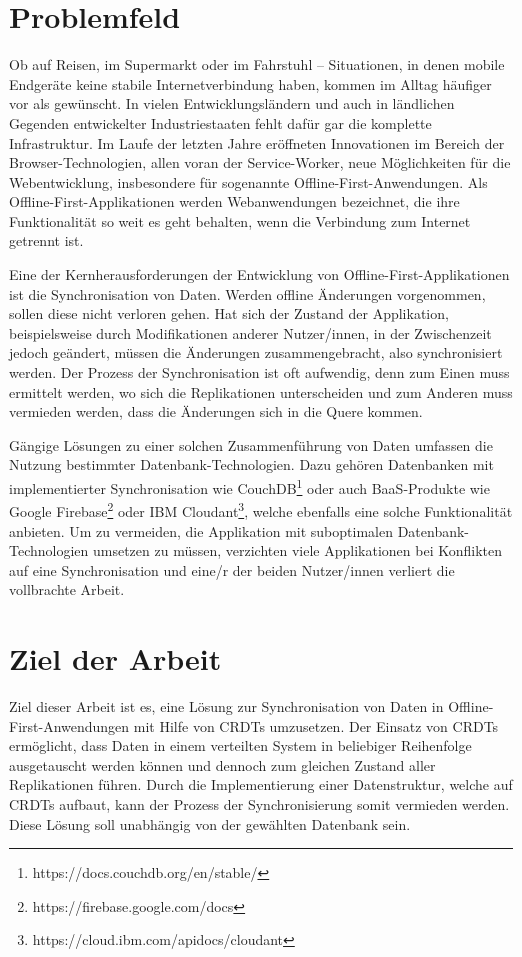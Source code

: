 \documentclass[a4paper, 12pt]{scrreprt}
\begin{document}
\section{Problemfeld}\label{sec:Problemfeld}

Ob auf Reisen, im Supermarkt oder im Fahrstuhl -- Situationen, in denen mobile Endgeräte keine stabile Internetverbindung haben, kommen im Alltag häufiger vor als gewünscht. In vielen Entwicklungsländern und auch in ländlichen Gegenden entwickelter Industriestaaten fehlt dafür gar die komplette Infrastruktur. Im Laufe der letzten Jahre eröffneten Innovationen im Bereich der Browser-Technologien, allen voran der Service-Worker, neue Möglichkeiten für die Webentwicklung, insbesondere für sogenannte Offline-First-Anwendungen. Als Offline-First-Applikationen werden Webanwendungen bezeichnet, die ihre Funktionalität so weit es geht behalten, wenn die Verbindung zum Internet getrennt ist.

Eine der Kernherausforderungen der Entwicklung von Offline-First-Applikationen ist die Synchronisation von Daten. Werden offline Änderungen vorgenommen, sollen diese nicht verloren gehen. Hat sich der Zustand der Applikation, beispielsweise durch Modifikationen anderer Nutzer/innen, in der Zwischenzeit jedoch geändert, müssen die Änderungen zusammengebracht, also synchronisiert werden. Der Prozess der Synchronisation ist oft aufwendig, denn zum Einen muss ermittelt werden, wo sich die Replikationen unterscheiden und zum Anderen muss vermieden werden, dass die Änderungen sich in die Quere kommen. 

Gängige Lösungen zu einer solchen Zusammenführung von Daten umfassen die Nutzung bestimmter Datenbank-Technologien. Dazu gehören Datenbanken mit implementierter Synchronisation wie CouchDB\footnote{https://docs.couchdb.org/en/stable/} oder auch \ac{BaaS}-Produkte wie Google Firebase\footnote{https://firebase.google.com/docs} oder IBM Cloudant\footnote{https://cloud.ibm.com/apidocs/cloudant}, welche ebenfalls eine solche Funktionalität anbieten. Um zu vermeiden, die Applikation mit suboptimalen Datenbank-Technologien umsetzen zu müssen, verzichten viele Applikationen bei Konflikten auf eine Synchronisation und eine/r der beiden Nutzer/innen verliert die vollbrachte Arbeit.

\section{Ziel der Arbeit} 
\label{sec:zieleDerArbeit}
Ziel dieser Arbeit ist es, eine Lösung zur Synchronisation von Daten in Offline-First-Anwendungen mit Hilfe von \acp{CRDT} umzusetzen. Der Einsatz von \acp{CRDT} ermöglicht, dass Daten in einem verteilten System in beliebiger Reihenfolge ausgetauscht werden können und dennoch zum gleichen Zustand aller Replikationen führen. Durch die Implementierung einer Datenstruktur, welche auf \acp{CRDT} aufbaut, kann der Prozess der Synchronisierung somit vermieden werden. Diese Lösung soll unabhängig von der gewählten Datenbank sein.
\end{document}
